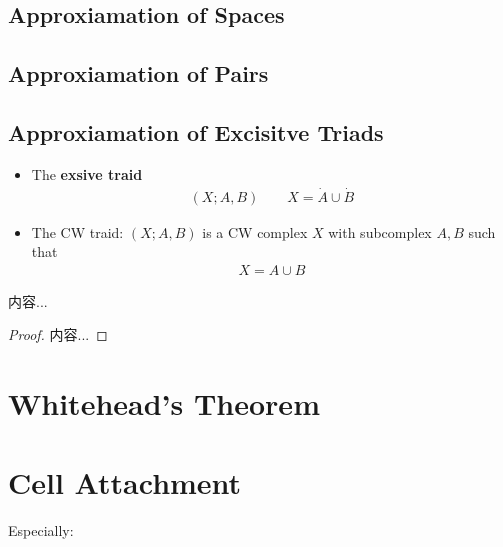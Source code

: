 \documentclass[Total.tex]{subfiles}
\begin{document}
			\subsection{Approxiamation of Spaces}
			\subsection{Approxiamation of Pairs}
			\subsection{Approxiamation of Excisitve Triads}
				\begin{Def}
					\begin{itemize}
						\item The \textbf{exsive traid}
						\begin{gather*}
							(X;A,B)\qquad X=\dot{A}\cup \dot{B}
						\end{gather*}
						\item The CW traid: $(X;A,B)$ is a CW complex $X$ with subcomplex $A,B$ such that
						\begin{gather*}
							X=A\cup B 
						\end{gather*}
					\end{itemize}
				\end{Def}
				
				\begin{theorem}
					内容...
				\end{theorem}
				\begin{proof}
					内容...
				\end{proof}
		\section{Whitehead's Theorem}
	\section{Cell Attachment}
	
	Especially:
\end{document}
